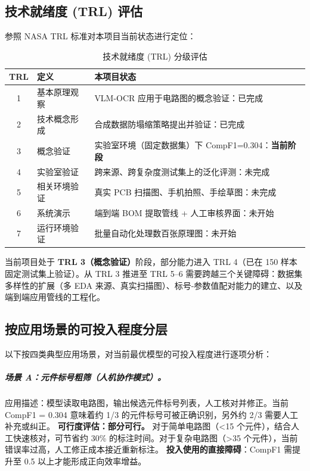 \subsection{技术就绪度 (TRL) 评估}

参照 NASA TRL 标准对本项目当前状态进行定位：

\begin{table}[h]
\centering
\caption{技术就绪度 (TRL) 分级评估}
\begin{tabular}{clp{7cm}}
\toprule
\textbf{TRL} & \textbf{定义} & \textbf{本项目状态} \\
\midrule
1 & 基本原理观察 & VLM-OCR 应用于电路图的概念验证：已完成 \\
2 & 技术概念形成 & 合成数据防塌缩策略提出并验证：已完成 \\
3 & 概念验证 & 实验室环境（固定数据集）下 CompF1=0.304：\textbf{当前阶段} \\
4 & 实验室验证 & 跨来源、跨复杂度测试集上的泛化评测：未完成 \\
5 & 相关环境验证 & 真实 PCB 扫描图、手机拍照、手绘草图：未完成 \\
6 & 系统演示 & 端到端 BOM 提取管线 + 人工审核界面：未开始 \\
7 & 运行环境验证 & 批量自动化处理数百张原理图：未开始 \\
\bottomrule
\end{tabular}
\end{table}

当前项目处于 \textbf{TRL 3（概念验证）}阶段，部分能力进入 TRL 4（已在 150 样本固定测试集上验证）。从 TRL 3 推进至 TRL 5--6 需要跨越三个关键障碍：数据集多样性的扩展（多 EDA 来源、真实扫描图）、标号-参数值配对能力的建立、以及端到端应用管线的工程化。

\subsection{按应用场景的可投入程度分层}

以下按四类典型应用场景，对当前最优模型的可投入程度进行逐项分析：

\subparagraph{场景 A：元件标号粗筛（人机协作模式）。}
应用描述：模型读取电路图，输出候选元件标号列表，人工核对并修正。当前 CompF1 = 0.304 意味着约 1/3 的元件标号可被正确识别，另外约 2/3 需要人工补充或纠正。
\textbf{可行度评估：部分可行。} 对于简单电路图（<15 个元件），结合人工快速核对，可节省约 30\% 的标注时间。对于复杂电路图（>35 个元件），当前错误率过高，人工修正成本接近重新标注。
\textbf{投入使用的直接障碍}：CompF1 需提升至 0.5 以上才能形成正向效率增益。

